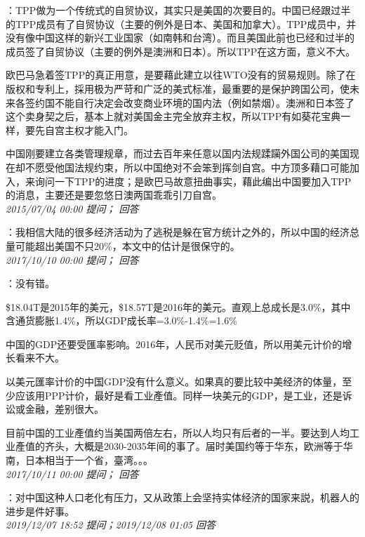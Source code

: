 \documentclass[twocolumn]{ctexart}
\begin{document}
：TPP做为一个传统式的自贸协议，其实只是美国的次要目的。中国已经跟过半的TPP成员有了自贸协议（主要的例外是日本、美国和加拿大）。TPP成员中，并没有像中国这样的新兴工业国家（如南韩和台湾）。而且美国此前也已经和过半的成员签了自贸协议（主要的例外是澳洲和日本）。所以TPP在这方面，意义不大。

欧巴马急着签TPP的真正用意，是要藉此建立以往WTO没有的贸易规则。除了在版权和专利上，採用极为严苛和广泛的美式标准，最重要的是保护跨国公司，使未来各签约国不能自行决定会改变商业环境的国内法（例如禁烟）。澳洲和日本签了这个卖身契之后，基本上就对美国金主完全放弃主权，所以TPP有如葵花宝典一样，要先自宫主权才能入门。

中国刚要建立各类管理规章，而过去百年来任意以国内法规蹂躏外国公司的美国现在却不愿受他国法规约束，所以中国绝对不会笨到挥剑自宫。中方顶多藉口可能加入，来询问一下TPP的进度；是欧巴马故意扭曲事实，藉此编出中国要加入TPP的消息，主要还是要忽悠日澳两国乖乖引刀自宫。\\

\textit{\hfill\noindent\small 2015/07/04 00:00 提问； 回答}

：我相信大陆的很多经济活动为了逃税是躲在官方统计之外的，所以中国的经济总量可能超出美国不只20\%，本文中的估计是很保守的。\\

\textit{\hfill\noindent\small 2017/10/10 00:00 提问； 回答}

：没有错。

\$18.04T是2015年的美元，\$18.57T是2016年的美元。直观上总成长是3.0\%，其中含通货膨胀1.4\%，所以GDP成长率=3.0\%-1.4\%=1.6\%

中国的GDP还要受匯率影响。2016年，人民币对美元贬值，所以用美元计价的增长看来不大。

以美元匯率计价的中国GDP没有什么意义。如果真的要比较中美经济的体量，至少应该用PPP计价，最好是看工业產值。同样一块美元的GDP，是工业，还是诉讼或金融，差别很大。

目前中国的工业產值约当美国两倍左右，所以人均只有后者的一半。要达到人均工业產值的齐头，大概是2030-2035年间的事了。届时美国约等于华东，欧洲等于华南，日本相当于一个省，臺湾。。。\\

\textit{\hfill\noindent\small 2017/10/11 00:00 提问； 回答}

：对中国这种人口老化有压力，又从政策上会坚持实体经济的国家来説，机器人的进步是件好事。\\

\textit{\hfill\noindent\small 2019/12/07 18:52 提问；2019/12/08 01:05 回答}
\end{document}
